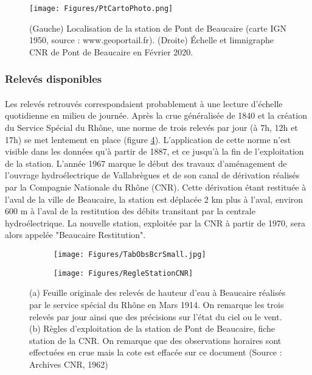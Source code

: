 \documentclass[11pt]{article}
\begin{document}
	\begin{figure}[h]
	\centering
		\texttt{[image: Figures/PtCartoPhoto.png]}
        \caption{(Gauche) Localisation de la station de Pont de Beaucaire (carte IGN 1950, source : www.geoportail.fr). (Droite) Échelle et limnigraphe CNR de Pont de Beaucaire en Février 2020.}	
		\label{fig:CartoPt}
	\end{figure}
		
	\subsubsection{Relevés disponibles}
	\paragraph{} Les relevés retrouvés correspondaient probablement à une lecture d'échelle quotidienne en milieu de journée. Après la crue généralisée de 1840 et la création du Service Spécial du Rhône, une norme de trois relevés par jour (à 7h, 12h et 17h) se met lentement en place (figure \ref{fig:RelevesPt}). L'application de cette norme n'est visible dans les données qu'à partir de 1887, et ce jusqu'à la fin de l'exploitation de la station.  L'année 1967 marque le début des travaux d'aménagement de l'ouvrage hydroélectrique de Vallabrègues et de son canal de dérivation réalisés par la Compagnie Nationale du Rhône (CNR). Cette dérivation étant restituée à l'aval de la ville de Beaucaire, la station est déplacée 2 km plus à l'aval, environ 600 m à l'aval de la restitution des débits transitant par la centrale hydroélectrique. La nouvelle station, exploitée par la CNR à partir de 1970, sera alors appelée "Beaucaire Restitution".
	
	\begin{figure}[h]
          \centering
            \begin{subfigure}{0.49\linewidth}
            \centering
            	\texttt{[image: Figures/TabObsBcrSmall.jpg]}\hfill
            	\caption{}
            	\label{subfig:TabObsPt}
            \end{subfigure}
            \begin{subfigure}{0.49\linewidth}
            \centering
            	\texttt{[image: Figures/RegleStationCNR]}
            	\caption{}
           		\label{subfig:RegleCNR}
            \end{subfigure}
      \caption{(a) Feuille originale des relevés de hauteur d'eau à Beaucaire réalisés par le service spécial du Rhône en Mars 1914. On remarque les trois relevés par jour ainsi que des précisions sur l'état du ciel ou le vent. (b) Règles d'exploitation de la station de Pont de Beaucaire, fiche station de la CNR. On remarque que des observations horaires sont effectuées en crue mais la cote est effacée sur ce document (Source : Archives CNR, 1962)}
	 \label{fig:RelevesPt}
		
	\end{figure}            
            
\end{document}
